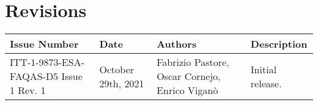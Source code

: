 
\section*{Revisions}
\label{sec:revisions}


\setlength\LTleft{0pt}
\setlength\LTright{0pt}
\tiny 
\begin{longtable}{|p{2cm}|p{1cm}|p{1.5cm}|p{9cm}|@{}}
\label{table:codeoperators} \\
\hline
\textbf{Issue Number}&\textbf{Date}&\textbf{Authors}&\textbf{Description}\\
\hline
ITT-1-9873-ESA-FAQAS-D5
Issue 1 Rev. 1&
October 29th, 2021&
Fabrizio Pastore, Oscar Cornejo, Enrico Viganò&
\begin{minipage}{8cm}
Initial release.

\end{minipage}
\\
\hline
                                                    
\end{longtable}
\normalsize

\clearpage